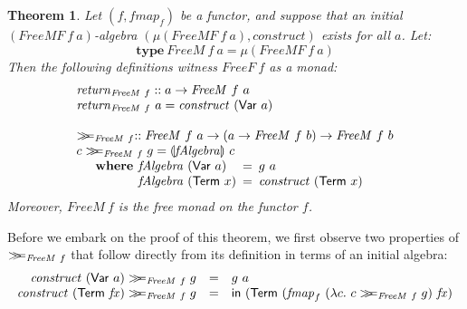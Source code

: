 \documentclass{jfp1}
\newcommand{\fold}[1]{\llparenthesis #1 \rrparenthesis}
\newcommand{\construct}{\mathsf{in}}
\newcommand{\mbind}{\mathrel{>\kern-0.45em>\kern-0.45em=}}
\newtheorem{theorem}{Theorem}
\newcommand{\kw}[1]{\textbf{#1}}
\begin{document}
\begin{theorem}
  Let $(f, \mathit{fmap}_f)$ be a functor, and suppose that an initial
  $(\mathit{FreeMF}~f~a)$-algebra $(\mu (\mathit{FreeMF}~f~a),
  \mathit{construct})$ exists for all $a$. Let:
  \begin{displaymath}
    \kw{type}~\mathit{FreeM}~f~a = \mu (\mathit{FreeMF}~f~a)
  \end{displaymath}
  Then the following definitions witness $\mathit{FreeF}~f$ as a monad:
  \begin{displaymath}
    \begin{array}{l}
      \mathit{return}_{\mathit{FreeM}~f} :: a \to \mathit{FreeM}~f~a \\
      \mathit{return}_{\mathit{FreeM}~f}~a = \mathit{construct}~(\mathsf{Var}~a) \\
      \\
      \mbind_{\mathit{FreeM}~f} :: \mathit{FreeM}~f~a \to (a \to \mathit{FreeM}~f~b) \to \mathit{FreeM}~f~b \\
      c \mbind_{\mathit{FreeM}~f} g = \fold{\mathit{fAlgebra}}~c\\
      \quad\begin{array}{r@{\hspace{0.4em}}l@{\hspace{0.5em}}c@{\hspace{0.5em}}l}
        \kw{where} & \mathit{fAlgebra}~(\mathsf{Var}~a) &=& g~a \\
        & \mathit{fAlgebra}~(\mathsf{Term}~x)&=&\mathit{construct}~(\mathsf{Term}~x)
      \end{array}
    \end{array}
  \end{displaymath}
  Moreover, $\mathit{FreeM}~f$ is the free monad on the functor $f$.
\end{theorem}

Before we embark on the proof of this theorem, we first observe two
properties of $\mbind_{\mathit{FreeM}~f}$ that follow directly from
its definition in terms of an initial algebra:
\begin{displaymath}
  \begin{array}{rcl}
    \mathit{construct}~(\mathsf{Var}~a) \mbind_{\mathit{FreeM}~f} g & = & g~a \\
    \mathit{construct}~(\mathsf{Term}~\mathit{fx}) \mbind_{\mathit{FreeM}~f} g & = & \construct~(\mathsf{Term}~(\mathit{fmap}_f~(\lambda c.~c\mbind_{\mathit{FreeM}~f}g)~\mathit{fx})
  \end{array}
\end{displaymath}
\end{document}
